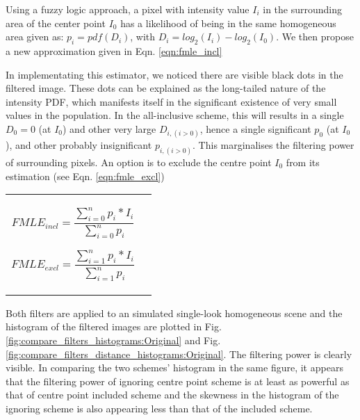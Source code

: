 Using a fuzzy logic approach, a pixel with intensity value $I_i$ in the surrounding area of the center point $I_0$ has a likelihood of being in the same homogeneous area given as: 
$p_i = pdf(D_i)$, with $D_i=log_2(I_i) - log_2(I_0)$.
We then propose a new approximation given in Eqn. \ref{eqn:fmle_incl} 

In implementating this estimator, we noticed there are visible black dots in the filtered image.
These dots can be explained as the long-tailed nature of the intensity PDF, 
  which manifests itself in the significant existence of very small values in the population.
In the all-inclusive scheme, this will results in 
	a single $D_0=0$ (at $I_0$) and other very large $D_{i, (i > 0)}$, hence
	a single significant $p_0$ (at $I_0$), and other probably insignificant $p_{i, (i>0)}$.
This marginalises the filtering power of surrounding pixels.
An option is to exclude the centre point $I_0$ from its estimation (see Eqn. \ref{eqn:fmle_excl})

\begin{tabular}{c c}
\begin{minipage}[c]{0.45\textwidth}
\begin{equation}
\label{eqn:fmle_incl}
FMLE_{incl}= \frac{\displaystyle{\sum_{i=0}^n{p_i * I_i} } }{\displaystyle{\sum_{i=0}^n{p_i } } }
\end{equation}
\end{minipage}
\begin{minipage}[c]{0.45\textwidth}
\begin{equation}
\label{eqn:fmle_excl}
FMLE_{excl}= \frac{\displaystyle{\sum_{i=1}^n{p_i * I_i} } }{\displaystyle{\sum_{i=1}^n{p_i } } } 
\end{equation}
\end{minipage}
\end{tabular}

Both filters are applied to an simulated single-look homogeneous scene 
and the histogram of the filtered images are plotted in Fig. \ref{fig:compare_filters_histograms:Original} and Fig. \ref{fig:compare_filters_distance_histograms:Original}.
The filtering power is clearly visible.
In comparing the two schemes' histogram in the same figure, it appears that 
	the filtering power of ignoring centre point scheme is at least as powerful as that of centre point included scheme and
	the skewness in the histogram of the ignoring scheme is also appearing less than that of the included scheme.
        
